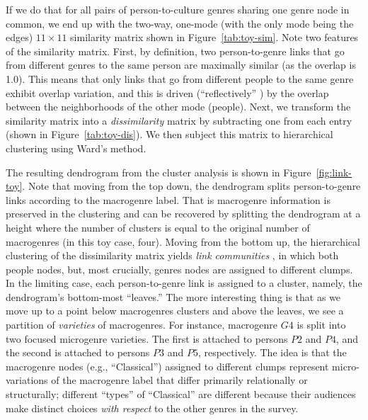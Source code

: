\documentclass[a4paper,12pt]{extarticle}
\begin{document}
If we do that for all pairs of person-to-culture genres sharing one genre node in common, we end up with the two-way, one-mode (with the only mode being the edges) $11 \times 11$ similarity matrix shown in Figure~\ref{tab:toy-sim}. Note two features of the similarity matrix. First, by definition, two person-to-genre links that go from different genres to the same person are maximally similar (as the overlap is 1.0). This means that only links that go from different people to the same genre exhibit overlap variation, and this is driven (``reflectively'' \citep{lizardo18}) by the overlap between the neighborhoods of the other mode (people). Next, we transform the similarity matrix into a {\em dissimilarity} matrix by subtracting one from each entry (shown in  Figure~\ref{tab:toy-dis}). We then subject this matrix to hierarchical clustering using Ward's \citeyearpar{ward63} method. 

The resulting dendrogram from the cluster analysis is shown in Figure~\ref{fig:link-toy}. Note that moving from the top down, the dendrogram splits person-to-genre links according to the macrogenre label. That is macrogenre information is preserved in the clustering and can be recovered by splitting the dendrogram at a height where the number of clusters is equal to the original number of macrogenres (in this toy case, four). Moving from the bottom up, the hierarchical clustering of the dissimilarity matrix yields {\em link communities} \citep{ahn_etal10}, in which both people nodes, but, most crucially, genres nodes are assigned to different clumps. In the limiting case, each person-to-genre link is assigned to a cluster, namely, the dendrogram's bottom-most ``leaves.'' The more interesting thing is that as we move up to a point below macrogenres clusters and above the leaves, we see a partition of {\em varieties} of macrogenres. For instance, macrogenre $G4$ is split into two focused microgenre varieties. The first is attached to persons $P2$ and $P4$, and the second is attached to persons $P3$ and $P5$, respectively. The idea is that the macrogenre nodes (e.g., ``Classical'') assigned to different clumps represent micro-variations of the macrogenre label that differ primarily relationally or structurally; different ``types'' of ``Classical'' are different because their audiences make distinct choices {\em with respect} to the other genres in the survey. 
\end{document}
